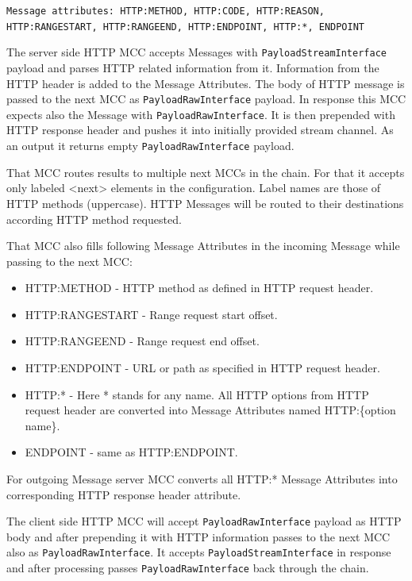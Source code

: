 \documentclass{book}
\begin{document}
\texttt{Message attributes: HTTP:METHOD, HTTP:CODE, HTTP:REASON, HTTP:RANGESTART, HTTP:RANGEEND, HTTP:ENDPOINT, HTTP:*, ENDPOINT}


The server side HTTP MCC accepts Messages with \texttt{PayloadStreamInterface} payload and parses HTTP related information from it. Information from the HTTP header is added to the Message Attributes. The body of HTTP message is passed to the next MCC as \texttt{PayloadRawInterface} payload. In response this MCC expects also the Message with \texttt{PayloadRawInterface}. It is then prepended with HTTP response header and pushes it into initially provided stream channel. As an output it returns empty \texttt{PayloadRawInterface} payload.

That MCC routes results to multiple next MCCs in the chain. For that it accepts only labeled <next> elements in the configuration. Label names are those of HTTP methods (uppercase). HTTP Messages will be routed to their destinations according HTTP method requested.

That MCC also fills following Message Attributes in the incoming Message while passing to the next MCC:
\begin{itemize}

\item HTTP:METHOD - HTTP method as defined in HTTP request header.

\item HTTP:RANGESTART - Range request start offset.

\item HTTP:RANGEEND - Range request end offset.

\item HTTP:ENDPOINT - URL or path as specified in HTTP request header.

\item HTTP:* - Here * stands for any name. All HTTP options from HTTP request header are converted into Message Attributes named HTTP:\{option name\}.

\item ENDPOINT - same as HTTP:ENDPOINT.

\end{itemize}

For outgoing Message server MCC converts all HTTP:* Message Attributes into corresponding HTTP response header attribute.

The client side HTTP MCC will accept \texttt{PayloadRawInterface} payload as HTTP body and after prepending it with HTTP information passes to the next MCC also as \texttt{PayloadRawInterface}. It accepts \texttt{PayloadStreamInterface} in response and after processing passes \texttt{PayloadRawInterface} back through the chain.
\end{document}
